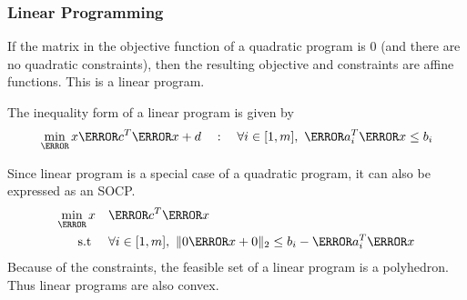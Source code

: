 \subsubsection{Linear Programming}
If the matrix in the objective function of a quadratic program is 0 (and there are no quadratic constraints), then the resulting objective and constraints are affine functions.
This is a linear program.
\begin{definition}
	The inequality form of a linear program is given by \[
		\min_\V{x} \V{c}^T\V{x} + d \quad : \quad \forall i\in[1,m],\ \V{a}_i^T\V{x} \leq b_i
	\]
	\label{defn:lp}
\end{definition}
Since linear program is a special case of a quadratic program, it can also be expressed as an SOCP.
\begin{align*}
	\min_\V{x} &\quad \V{c}^T\V{x}\\
	\text{s.t } &\quad \forall i\in[1,m],\ \|0\V{x} + 0\|_2 \leq b_i - \V{a}_i^T\V{x}
\end{align*}
Because of the constraints, the feasible set of a linear program is a polyhedron.
Thus linear programs are also convex.



